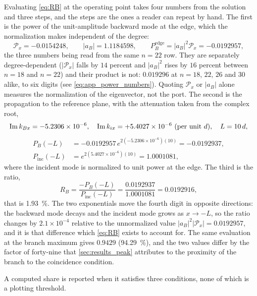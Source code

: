 Evaluating \eqref{eq:RB} at the operating point takes four numbers from the solution and
three steps, and the steps are the ones a reader can repeat by hand.  The first is
the power of the unit-amplitude backward mode at the edge, which the
normalization makes independent of the degree:
\begin{equation*}
\mathcal{P}_x=-0.0154248,\qquad |a_B|=1.1184598,\qquad
P_{B}^{\text{edge}}=|a_B|^{2}\mathcal{P}_x=-0.0192957 ,
\end{equation*}
the three numbers being read from the same $n=22$ row.  They are separately
degree-dependent ($|\mathcal{P}_x|$ falls by $14$ percent and $|a_B|^{2}$ rises
by $16$ percent between $n=18$ and $n=22$) and their product is not:
$0.019296$ at $n=18$, $22$, $26$ and $30$ alike, to six digits
(see \eqref{eq:app_power_numbers}).  Quoting $\mathcal{P}_x$ or $|a_B|$ alone measures the normalization of the eigenvector, not the port.
The second is the propagation to the reference plane, with the attenuation taken
from the complex root,
\begin{equation*}
\operatorname{Im} k_{Bx}=-5.2306\times10^{-6},\quad
\operatorname{Im} k_{ix}=+5.4027\times10^{-6}\ \text{(per unit $d$)},\quad L=10\,d ,
\end{equation*}
\begin{equation*}
\begin{aligned}
P_{B}(-L)&=-0.0192957\,e^{2(-5.2306\times10^{-6})(10)}=-0.0192937,\\
P_{\text{inc}}(-L)&=e^{2(5.4027\times10^{-6})(10)}=1.0001081 ,
\end{aligned}
\end{equation*}
where the incident mode is normalized to unit power at the edge.  The third is
the ratio,
\begin{equation*}
R_B=\frac{-P_{B}(-L)}{P_{\text{inc}}(-L)}
=\frac{0.0192937}{1.0001081}=0.0192916 ,
\end{equation*}
that is \SI{1.93}{\percent}.  The two exponentials move the fourth digit in
opposite directions: the backward mode decays and the incident mode grows as
$x\to-L$, so the ratio changes by $2.1\times10^{-4}$ relative to the
unnormalized value $|a_B|^{2}|\mathcal{P}_x|=0.0192957$, and it is that
difference which \eqref{eq:RB} exists to account for.  The same evaluation at the
branch maximum gives $0.9429$ (\SI{94.29}{\percent}), and the two values differ
by the factor of forty-nine that \cref{sec:results_peak} attributes to the proximity
of the branch to the coincidence condition.

A computed share is reported when it satisfies three conditions, none of which
is a plotting threshold.

